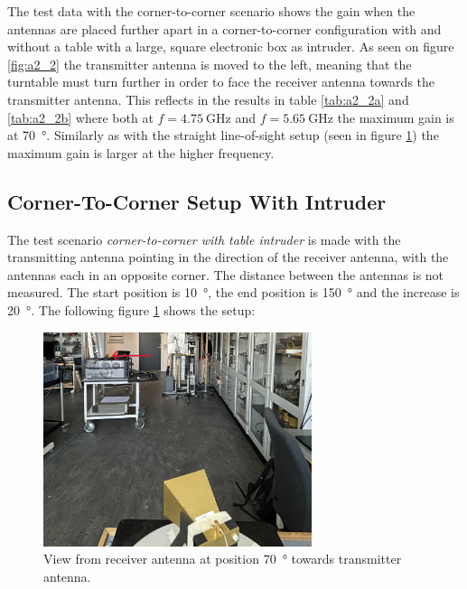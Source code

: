 The test data with the corner-to-corner scenario shows the gain when the antennas are placed further apart in a corner-to-corner configuration with and without a table with a large, square electronic box as intruder. As seen on figure \ref{fig:a2_2} the transmitter antenna is moved to the left, meaning that the turntable must turn further in order to face the receiver antenna towards the transmitter antenna. This reflects in the results in table \ref{tab:a2_2a} and \ref{tab:a2_2b} where both at $f=\SI{4.75}{\giga\hertz}$ and $f=\SI{5.65}{\giga\hertz}$ the maximum gain is at \SI{70}{\degree}. Similarly as with the straight line-of-sight setup (seen in figure \ref{fig:a2_4}) the maximum gain is larger at the higher frequency. 

\subsection{Corner-To-Corner Setup With Intruder}
The test scenario \textit{corner-to-corner with table intruder} is made with the transmitting antenna pointing in the direction of the receiver antenna, with the antennas each in an opposite corner. The distance between the antennas is not measured. The start position is \SI{10}{\degree}, the end position is \SI{150}{\degree} and the increase is \SI{20}{\degree}. The following figure \ref{fig:a2_4} shows the setup:
\begin{figure}[H]
    \centering
    \includegraphics[width=0.7\textwidth]{figures/test_intruder_table.JPG}
    \caption{View from receiver antenna at position \SI{70}{\degree} towards transmitter antenna.} \label{fig:a2_4}
\end{figure}

